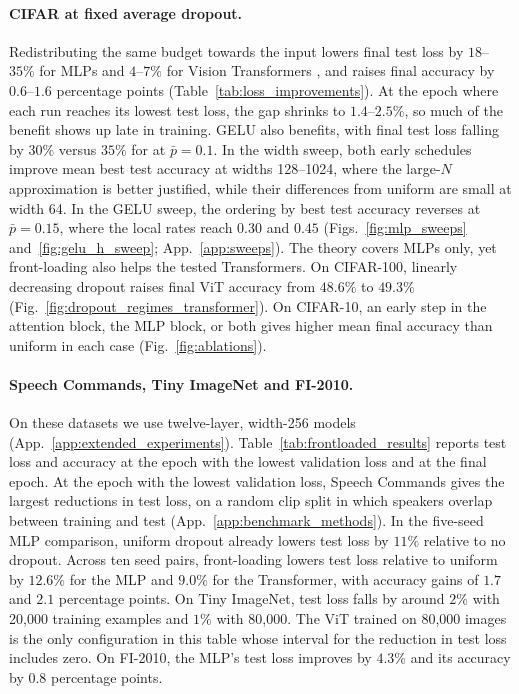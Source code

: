 \paragraph{CIFAR at fixed average dropout.}
Redistributing the same budget towards the input lowers final test loss by $18$--$35\%$ for MLPs and $4$--$7\%$ for Vision Transformers \cite{dosovitskiy2021vit}, and raises final accuracy by $0.6$--$1.6$ percentage points (Table~\ref{tab:loss_improvements}). At the epoch where each run reaches its lowest test loss, the gap shrinks to $1.4$--$2.5\%$, so much of the benefit shows up late in training. GELU also benefits, with final test loss falling by $30\%$ versus $35\%$ for \relu{} at $\bar p=0.1$. In the \relu{} width sweep, both early schedules improve mean best test accuracy at widths 128--1024, where the large-$N$ approximation is better justified, while their differences from uniform are small at width 64. In the GELU sweep, the ordering by best test accuracy reverses at $\bar p=0.15$, where the local rates reach $0.30$ and $0.45$ (Figs.~\ref{fig:mlp_sweeps} and~\ref{fig:gelu_h_sweep}; App.~\ref{app:sweeps}). The theory covers MLPs only, yet front-loading also helps the tested Transformers. On CIFAR-100, linearly decreasing dropout raises final ViT accuracy from $48.6\%$ to $49.3\%$ (Fig.~\ref{fig:dropout_regimes_transformer}). On CIFAR-10, an early step in the attention block, the MLP block, or both gives higher mean final accuracy than uniform in each case (Fig.~\ref{fig:ablations}).

\paragraph{Speech Commands, Tiny ImageNet and FI-2010.}
\label{sec:extended_benchmarks}
On these datasets we use twelve-layer, width-256 models (App.~\ref{app:extended_experiments}). Table~\ref{tab:frontloaded_results} reports test loss and accuracy at the epoch with the lowest validation loss and at the final epoch. At the epoch with the lowest validation loss, Speech Commands gives the largest reductions in test loss, on a random clip split in which speakers overlap between training and test (App.~\ref{app:benchmark_methods}). In the five-seed MLP comparison, uniform dropout already lowers test loss by $11\%$ relative to no dropout. Across ten seed pairs, front-loading lowers test loss relative to uniform by $12.6\%$ for the MLP and $9.0\%$ for the Transformer, with accuracy gains of $1.7$ and $2.1$ percentage points. On Tiny ImageNet, test loss falls by around $2\%$ with 20,000 training examples and $1\%$ with 80,000. The ViT trained on 80,000 images is the only configuration in this table whose interval for the reduction in test loss includes zero. On FI-2010, the MLP's test loss improves by $4.3\%$ and its accuracy by $0.8$ percentage points.

